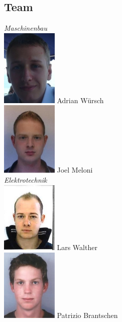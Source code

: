 \subsection{Team}

\begin{minipage}{0.4\textwidth}
\begin{flushleft} \large

	\emph{Maschinenbau} \\
	\includegraphics[width=0.2\textwidth]{./04_Projektmanagement/fig/adrianwuersch.jpg}
	Adrian Würsch\\
	\includegraphics[width=0.2\textwidth]{./04_Projektmanagement/fig/joelmeloni.jpg}
	Joel Meloni\\
	\emph{Elektrotechnik} \\
	\includegraphics[width=0.2\textwidth]{./04_Projektmanagement/fig/larswalther.jpg}
	Lars Walther\\
	\includegraphics[width=0.2\textwidth]{./04_Projektmanagement/fig/patriziobrantschen.jpg}
	Patrizio Brantschen\\

\end{flushleft}
\end{minipage}

